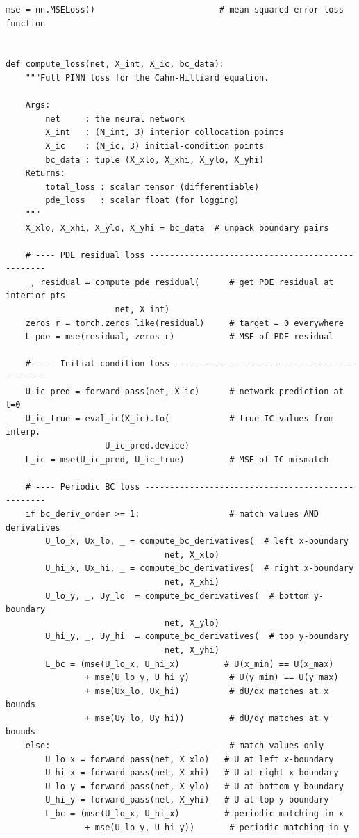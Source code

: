 \documentclass[11pt,a4paper]{article}
\begin{document}
\begin{lstlisting}
mse = nn.MSELoss()                         # mean-squared-error loss function


def compute_loss(net, X_int, X_ic, bc_data):
    """Full PINN loss for the Cahn-Hilliard equation.

    Args:
        net     : the neural network
        X_int   : (N_int, 3) interior collocation points
        X_ic    : (N_ic, 3) initial-condition points
        bc_data : tuple (X_xlo, X_xhi, X_ylo, X_yhi)
    Returns:
        total_loss : scalar tensor (differentiable)
        pde_loss   : scalar float (for logging)
    """
    X_xlo, X_xhi, X_ylo, X_yhi = bc_data  # unpack boundary pairs

    # ---- PDE residual loss -------------------------------------------------
    _, residual = compute_pde_residual(      # get PDE residual at interior pts
                      net, X_int)
    zeros_r = torch.zeros_like(residual)     # target = 0 everywhere
    L_pde = mse(residual, zeros_r)           # MSE of PDE residual

    # ---- Initial-condition loss --------------------------------------------
    U_ic_pred = forward_pass(net, X_ic)      # network prediction at t=0
    U_ic_true = eval_ic(X_ic).to(            # true IC values from interp.
                    U_ic_pred.device)
    L_ic = mse(U_ic_pred, U_ic_true)         # MSE of IC mismatch

    # ---- Periodic BC loss --------------------------------------------------
    if bc_deriv_order >= 1:                  # match values AND derivatives
        U_lo_x, Ux_lo, _ = compute_bc_derivatives(  # left x-boundary
                                net, X_xlo)
        U_hi_x, Ux_hi, _ = compute_bc_derivatives(  # right x-boundary
                                net, X_xhi)
        U_lo_y, _, Uy_lo  = compute_bc_derivatives(  # bottom y-boundary
                                net, X_ylo)
        U_hi_y, _, Uy_hi  = compute_bc_derivatives(  # top y-boundary
                                net, X_yhi)
        L_bc = (mse(U_lo_x, U_hi_x)         # U(x_min) == U(x_max)
                + mse(U_lo_y, U_hi_y)        # U(y_min) == U(y_max)
                + mse(Ux_lo, Ux_hi)          # dU/dx matches at x bounds
                + mse(Uy_lo, Uy_hi))         # dU/dy matches at y bounds
    else:                                    # match values only
        U_lo_x = forward_pass(net, X_xlo)   # U at left x-boundary
        U_hi_x = forward_pass(net, X_xhi)   # U at right x-boundary
        U_lo_y = forward_pass(net, X_ylo)   # U at bottom y-boundary
        U_hi_y = forward_pass(net, X_yhi)   # U at top y-boundary
        L_bc = (mse(U_lo_x, U_hi_x)         # periodic matching in x
                + mse(U_lo_y, U_hi_y))       # periodic matching in y


\end{lstlisting}
\end{document}
